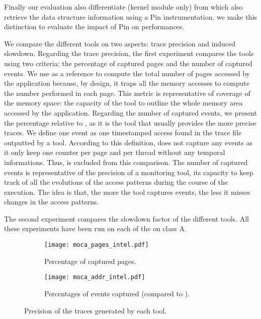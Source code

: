 Finally our evaluation also differentiate \Moca (kernel module only) from
\MocaPin which also retrieve the data structure information using a Pin
instrumentation, we make this distinction to evaluate the impact of Pin on
\Moca performances.

We compare the different tools on two aspects: trace precision and induced slowdown. Regarding the trace precision, the first experiment compares the tools
using two criteria:  the
percentage of captured pages and the number of captured events.  We use \TABARNAC as a reference to compute the total number of pages accessed by the
application because, by design, it traps all the memory accesses to compute the number performed in each page. This metric is representative of coverage of the
memory space: the capacity of the tool to outline the whole memory area accessed by the application. Regarding the number of captured events, we present the percentage
relative to \Moca, as it is the tool that usually provides the more precise traces. We define one event as one
timestamped access found in the trace file outputted by a tool. According to this definition, \TABARNAC does not capture any events as it only keep one
counter per page and per thread without any temporal informations. Thus, \TABARNAC is excluded from this comparison. The number of captured events is representative
of the precision of a monitoring tool, its capacity to keep track of all the evolutions of the access patterns during the course of the execution. The idea is
that, the more the tool captures events, the less it misses changes in the access patterns.

The second experiment compares the
slowdown factor of the different tools.  All these experiments have been run on each of the \NPB on class A.

\begin{figure}[htb]
    \centering
    \begin{subfigure}{\linewidth}
        \texttt{[image: moca\_pages\_intel.pdf]}
        \caption{Percentage of captured pages.}
        \label{fig:pages}
    \end{subfigure}
    \begin{subfigure}{\linewidth}
        \texttt{[image: moca\_addr\_intel.pdf]}
        \caption{Percentages of events captured (compared to \Moca).}
        \label{fig:addr}
    \end{subfigure}
    \caption{Precision of the traces generated by each tool.}
    \label{fig:pages-addr}
\end{figure}

